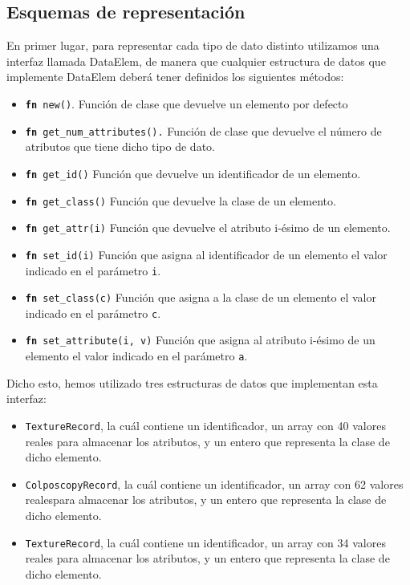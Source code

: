 \documentclass[size=a4, parskip=half, titlepage=false, toc=flat, toc=bib, 12pt]{scrartcl}
\begin{document}
\subsection{Esquemas de representación}
En primer lugar, para representar cada tipo de dato distinto utilizamos una interfaz llamada DataElem, de manera que cualquier estructura de datos que implemente DataElem deberá tener definidos los siguientes métodos:
\begin{itemize}
    \item \texttt{\textbf{fn} new()}. Función de clase que devuelve un elemento por defecto
    \item \texttt{\textbf{fn} get\_num\_attributes().} Función de clase que devuelve el número de atributos que tiene dicho tipo de dato.
    \item \texttt{\textbf{fn} get\_id()}  Función que devuelve un identificador de un elemento.
    \item \texttt{\textbf{fn} get\_class()} Función que devuelve la clase de un elemento.
    \item \texttt{\textbf{fn} get\_attr(i)} Función que devuelve el atributo i-ésimo de un elemento.
    \item \texttt{\textbf{fn} set\_id(i)} Función que asigna al identificador de un elemento el valor indicado en el parámetro \texttt{i}.
    \item \texttt{\textbf{fn} set\_class(c)} Función que asigna a la clase de un elemento el valor indicado en el parámetro \texttt{c}.
    \item \texttt{\textbf{fn} set\_attribute(i, v)} Función que asigna al atributo i-ésimo de un elemento el valor indicado en el parámetro \texttt{a}.
\end{itemize}

Dicho esto, hemos utilizado tres estructuras de datos que implementan esta interfaz:
\begin{itemize}
    \item \texttt{TextureRecord}, la cuál contiene un identificador, un array con 40 valores reales para almacenar los atributos, y un entero que representa la clase de dicho elemento.
    \item \texttt{ColposcopyRecord}, la cuál contiene un identificador, un array con 62 valores realespara almacenar los atributos, y un entero que representa la clase de dicho elemento.
    \item \texttt{TextureRecord}, la cuál contiene un identificador, un array con 34 valores reales para almacenar los atributos, y un entero que representa la clase de dicho elemento.
\end{itemize}
\end{document}
